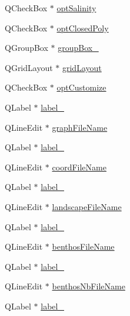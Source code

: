 \begin{DoxyCompactItemize}
Q\+Check\+Box $\ast$ \mbox{\hyperlink{class_ui___save_graph_dialog_a99cac4e822f045ac8729acd3367e5c50}{opt\+Salinity}}
\item 
Q\+Check\+Box $\ast$ \mbox{\hyperlink{class_ui___save_graph_dialog_ad51d628536e96139f58d8fa34cadf6d1}{opt\+Closed\+Poly}}
\item 
Q\+Group\+Box $\ast$ \mbox{\hyperlink{class_ui___save_graph_dialog_a842bddda299fe1a8285701246fa105e2}{group\+Box\+\_}}
\item 
Q\+Grid\+Layout $\ast$ \mbox{\hyperlink{class_ui___save_graph_dialog_aa75e09d4305b92ace4567f85df88fb2d}{grid\+Layout}}
\item 
Q\+Check\+Box $\ast$ \mbox{\hyperlink{class_ui___save_graph_dialog_a7cbe76a02f1e31226673af4a8ddfb5fc}{opt\+Customize}}
\item 
Q\+Label $\ast$ \mbox{\hyperlink{class_ui___save_graph_dialog_aaeeb926c621217c3a8939bb5988cbe16}{label\+\_}}
\item 
Q\+Line\+Edit $\ast$ \mbox{\hyperlink{class_ui___save_graph_dialog_ab355ee75477f205d3633aa210dded700}{graph\+File\+Name}}
\item 
Q\+Label $\ast$ \mbox{\hyperlink{class_ui___save_graph_dialog_a3146d47d0f3618f5fc3095c611e01198}{label\+\_}}
\item 
Q\+Line\+Edit $\ast$ \mbox{\hyperlink{class_ui___save_graph_dialog_a97bc670a27874b73237bdfac986aba93}{coord\+File\+Name}}
\item 
Q\+Label $\ast$ \mbox{\hyperlink{class_ui___save_graph_dialog_a6a3d885e37f773f4421ec09fec35c6fd}{label\+\_}}
\item 
Q\+Line\+Edit $\ast$ \mbox{\hyperlink{class_ui___save_graph_dialog_aba0edb63ae30e022df06be8759036b8e}{landscape\+File\+Name}}
\item 
Q\+Label $\ast$ \mbox{\hyperlink{class_ui___save_graph_dialog_aac8db0d86029b5abbe724b0b671787c1}{label\+\_}}
\item 
Q\+Line\+Edit $\ast$ \mbox{\hyperlink{class_ui___save_graph_dialog_ae1cd13196e4617e66928c77a1d587e57}{benthos\+File\+Name}}
\item 
Q\+Label $\ast$ \mbox{\hyperlink{class_ui___save_graph_dialog_aa7d73b83acef75b9bceb06367cbd1006}{label\+\_}}
\item 
Q\+Line\+Edit $\ast$ \mbox{\hyperlink{class_ui___save_graph_dialog_af5ec08329aef8f59064e59234f18a034}{benthos\+Nb\+File\+Name}}
\item 
Q\+Label $\ast$ \mbox{\hyperlink{class_ui___save_graph_dialog_acd2375bb596c72dc93c0c975cdf6b809}{label\+\_}}

\end{DoxyCompactItemize}
